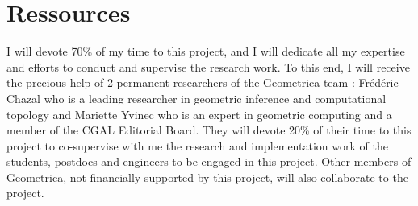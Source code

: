 








\section{Ressources}

I will devote 70\% of my time to this project, and I will dedicate all my expertise and efforts to conduct and supervise the research work. To this end, I will receive the precious help of 2 permanent researchers of the Geometrica team : Fr\'ed\'eric Chazal who is a  leading researcher in geometric inference and computational topology and Mariette Yvinec who is an expert in geometric computing and a member of the CGAL Editorial Board. They will devote 20\% of their time to this project to co-supervise with me the research and implementation work of the students, postdocs and engineers to be engaged in this project. Other members of Geometrica,
not financially supported by this project, will also collaborate to the project.

